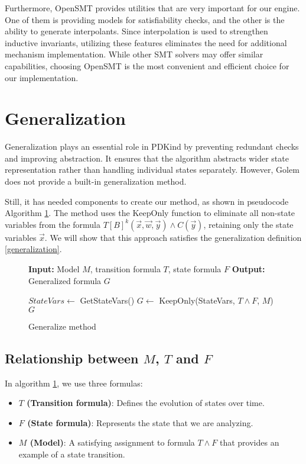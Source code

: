 Furthermore, OpenSMT provides utilities that are very important for our engine. One of them is providing models for satisfiability checks, and the other is the ability to generate interpolants. Since interpolation is used to strengthen inductive invariants, utilizing these features eliminates the need for additional mechanism implementation. While other SMT solvers may offer similar capabilities, choosing OpenSMT is the most convenient and efficient choice for our implementation.

\section*{Generalization}

\noindent Generalization plays an essential role in PDKind by preventing redundant checks and improving abstraction. It ensures that the algorithm abstracts wider state representation rather than handling individual states separately. However, Golem does not provide a built-in generalization method.

Still, it has needed components to create our method, as shown in pseudocode Algorithm \ref{alg:2}. The method uses the KeepOnly function to eliminate all non-state variables from the formula \( T[B]^k(\vec{x}, \vec{w}, \vec{y}) \wedge C(\vec{y}) \), retaining only the state variables $\vec{x}$. We will show that this approach satisfies the generalization definition \ref{generalization}.

\begin{figure}[H]
    \begin{mdframed}
        \begin{algorithmic}[1]
            \State \textbf{Input:} Model $M$, transition formula $T$, state formula $F$
            \State \textbf{Output:} Generalized formula $G$

            \State $StateVars \gets$ GetStateVars()
            \State $G \gets$ KeepOnly(StateVars, $T \wedge F$, $M$)
            \State \Return $G$

        \end{algorithmic}
    \end{mdframed}
    \caption{Generalize method}\label{alg:2}
\end{figure}

\subsection*{Relationship between $M$, $T$ and $F$}
\noindent In algorithm \ref{alg:2}, we use three formulas:
\begin{itemize}
    \item \textbf{$T$ (Transition formula)}: Defines the evolution of states over time.
    \item \textbf{$F$ (State formula)}: Represents the state that we are analyzing.
    \item \textbf{$M$ (Model)}: A satisfying assignment to formula $T \land F$ that provides an example of a state transition.
\end{itemize}

